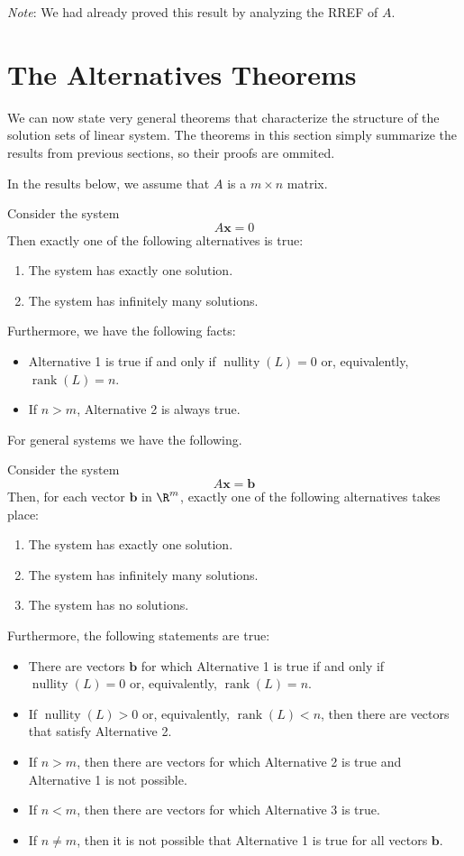 \documentclass[12pt]{article}
\DeclareMathOperator{\rank}{rank}
\DeclareMathOperator{\nullity}{nullity}
\begin{document}
\emph{Note}: We had already proved this result by analyzing the RREF of $A$.

\section{The Alternatives Theorems}

We can now state very general theorems that characterize the structure of the solution sets of linear system. The theorems in this section simply summarize the results from previous sections, so their proofs are ommited.  

In the results below, we assume that $A$ is a $m\times n$ matrix.

\begin{theorem} Consider the system
\[
A\mathbf{x}=0
\]
Then exactly one of the following alternatives is true:
\begin{enumerate}
\item The system has exactly one solution.
\item The system has infinitely many solutions.
\end{enumerate}
Furthermore, we have the following facts:
\begin{itemize}
\item Alternative 1 is true if and only if $\nullity(L)=0$ or, equivalently, $\rank(L)=n$.
\item If $n>m$, Alternative 2 is always true.
\end{itemize}
\end{theorem}

For general systems we have the following.

\begin{theorem} Consider the system
\[
A\mathbf{x}=\mathbf{b}
\]
Then, for each vector $\mathbf{b}$ in $\R^m$, exactly one of the following alternatives takes place:
\begin{enumerate}
\item The system has exactly one solution.
\item The system has infinitely many solutions.
\item The system has no solutions.
\end{enumerate}
Furthermore, the following statements are true:
\begin{itemize}
\item There are vectors $\mathbf{b}$ for which Alternative 1 is true if and only if $\nullity(L)=0$ or, equivalently, $\rank(L)=n$.
\item If $\nullity(L)>0$ or, equivalently, $\rank(L)<n$, then there are vectors that satisfy Alternative 2.
\item If $n>m$, then there are vectors for which Alternative 2 is true and Alternative 1 is not possible.
\item If $n<m$, then there are vectors for which Alternative 3 is true.
\item If $n\ne m$, then it is not possible that Alternative 1 is true for all vectors $\mathbf{b}$.
\end{itemize}
\end{theorem}
\end{document}
